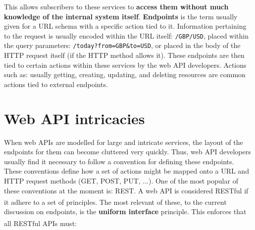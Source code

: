 \documentclass[]{full}
\theoremstyle{definition}
\begin{document}
This allows subscribers to these services to \textbf{access them without much knowledge of the internal system itself}. \textbf{Endpoints} is the term usually given for a URL schema with a specific action tied to it. Information pertaining to the request is usually encoded within the URL itself: \verb|/GBP/USD|, placed within the query parameters: \verb|/today?from=GBP&to=USD|, or placed in the body of the HTTP request itself (if the HTTP method allows it). These endpoints are then tied to certain actions within these services by the web API developers. Actions such as: usually getting, creating, updating, and deleting resources are common actions tied to external endpoints.

\section{Web API intricacies}

When web APIs are modelled for large and intricate services, the layout of the endpoints for them can become cluttered very quickly. Thus, web API developers usually find it necessary to follow a convention for defining these endpoints. These conventions define how a set of actions might be mapped onto a URL and HTTP request methods (GET, POST, PUT, ...). One of the most popular of these conventions at the moment is: REST. A web API is considered RESTful if it adhere to a set of principles\textsuperscript{\cite{richardson_ruby_2007}}. The most relevant of these, to the current discussion on endpoints, is the \textbf{uniform interface} principle. This enforces that all RESTful APIs must\textsuperscript{\cite{fielding_2000}}:

\end{document}

